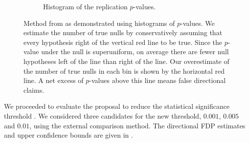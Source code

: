 \documentclass[aoas, preprint]{imsart}
\theoremstyle{definition}
\theoremstyle{custom}
\begin{document}
\begin{figure}[htbp]
\begin{subfigure}[t]{0.49\hsize}
      \caption{Histogram of the replication $p$-values.}
    \label{fig:fdp-replication}
    \end{subfigure}
    \caption{Method from \citet{Storey:2002vj} as demonstrated using histograms of $p$-values. We estimate the number of true nulls by conservatively assuming that every hypothesis right of the vertical red line to be true. Since the $p$-value under the null is superuniform, on average there are fewer null hypotheses left of the line than right of the line. Our overestimate of the number of true nulls in each bin is shown by the horizontal red line. A net excess of $p$-values above this line means false directional claims.}
  \end{figure}

  We proceeded to evaluate the proposal to reduce the statistical significance threshold \citep{Benjamin:2018gh}. We considered three candidates for the new threshold, $0.001$, $0.005$ and $0.01$, using the external comparison method. The directional FDP estimates and upper confidence bounds are given in .
\end{document}
